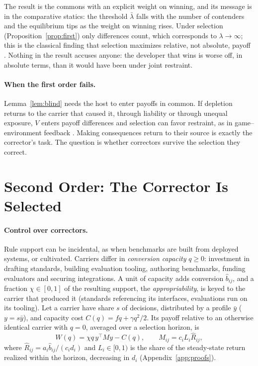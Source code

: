 \documentclass[letterpaper]{article} %
\theoremstyle{definition}
\begin{document}
The result is the commons \citep{hardin1968,olson1965} with an explicit weight on winning, and its message is in the comparative statics: the threshold $\bar\lambda$ falls with the number of contenders and the equilibrium tips as the weight on winning rises. Under selection (Proposition~\ref{prop:first}) only differences count, which corresponds to $\lambda\to\infty$; this is the classical finding that selection maximizes relative, not absolute, payoff \citep{schaffer1988,vegaredondo1997}. Nothing in the result accuses anyone: the developer that wins is worse off, in absolute terms, than it would have been under joint restraint.

\paragraph{When the first order fails.} Lemma~\ref{lem:blind} needs the host to enter payoffs in common. If depletion returns to the carrier that caused it, through liability or through unequal exposure, $V$ enters payoff differences and selection can favor restraint, as in game--environment feedback \citep{weitz2016,tilman2020}. Making consequences return to their source is exactly the corrector's task. The question is whether correctors survive the selection they correct.

\section{Second Order: The Corrector Is Selected}\label{sec:second}

\paragraph{Control over correctors.} Rule support can be incidental, as when benchmarks are built from deployed systems, or cultivated. Carriers differ in \emph{conversion capacity} $q\ge0$: investment in drafting standards, building evaluation tooling, authoring benchmarks, funding evaluators and securing integrations. A unit of capacity adds conversion $\hat b_{ij}$, and a fraction $\chi\in[0,1]$ of the resulting support, the \emph{appropriability}, is keyed to the carrier that produced it (standards referencing its interfaces, evaluations run on its tooling). Let a carrier have share $s$ of decisions, distributed by a profile $\bar y$ ($y=s\bar y$), and capacity cost $C(q)=fq+\gamma q^2/2$. Its payoff relative to an otherwise identical carrier with $q=0$, averaged over a selection horizon, is
\begin{equation}\label{eq:W}
W(q)=\chi q\,y^\top My-C(q),\qquad M_{ij}=c_iL_i\hat R_{ij},
\end{equation}
where $\hat R_{ij}=a_i\hat b_{ij}/(c_id_i)$ and $L_i\in[0,1)$ is the share of the steady-state return realized within the horizon, decreasing in $d_i$ (Appendix~\ref{app:proofs}).
\end{document}
